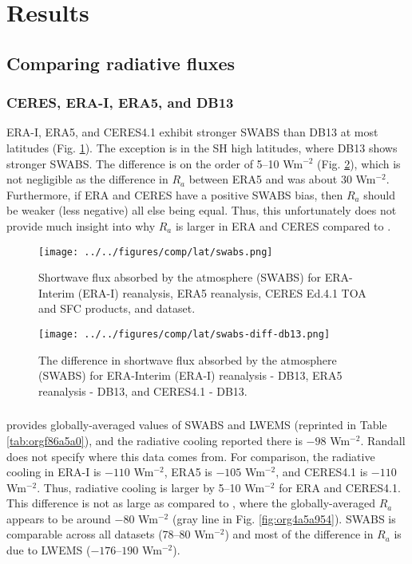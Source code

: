 \documentclass[11pt]{article}
\begin{document}
\section{Results}
\label{sec:orgb57f76e}
\subsection{Comparing radiative fluxes}
\label{sec:orgdd37950}
\subsubsection{CERES, ERA-I, ERA5, and DB13}
\label{sec:orga0d8db3}
ERA-I, ERA5, and CERES4.1 exhibit stronger SWABS than DB13 at most latitudes (Fig. \ref{fig:orgc1199f7}). The exception is in the SH high latitudes, where DB13 shows stronger SWABS. The difference is on the order of 5--10 Wm\(^{-2}\) (Fig. \ref{fig:org30a1620}), which is not negligible as the difference in \(R_a\) between ERA5 and \cite{hartmann_global_2016} was about 30 Wm\(^{-2}\). Furthermore, if ERA and CERES have a positive SWABS bias, then \(R_a\) should be weaker (less negative) all else being equal. Thus, this unfortunately does not provide much insight into why \(R_a\) is larger in ERA and CERES compared to \cite{hartmann_global_2016}.

\begin{figure}[htbp]
\centering
\texttt{[image: ../../figures/comp/lat/swabs.png]}
\caption{\label{fig:orgc1199f7}Shortwave flux absorbed by the atmosphere (SWABS) for ERA-Interim (ERA-I) reanalysis, ERA5 reanalysis, CERES Ed.4.1 TOA and SFC products, and \cite{donohoe_seasonal_2013} dataset.}
\end{figure}

\begin{figure}[htbp]
\centering
\texttt{[image: ../../figures/comp/lat/swabs-diff-db13.png]}
\caption{\label{fig:org30a1620}The difference in shortwave flux absorbed by the atmosphere (SWABS) for ERA-Interim (ERA-I) reanalysis - DB13, ERA5 reanalysis - DB13, and CERES4.1 - DB13.}
\end{figure}

\subsubsection{\cite{randall_atmosphere_2012}}
\label{sec:org819881b}
\cite{randall_atmosphere_2012} provides globally-averaged values of SWABS and LWEMS (reprinted in Table \ref{tab:orgf86a5a0}), and the radiative cooling reported there is \(-98\) Wm\(^{-2}\). Randall does not specify where this data comes from. For comparison, the radiative cooling in ERA-I is \(-110\) Wm\(^{-2}\), ERA5 is \(-105\) Wm\(^{-2}\), and CERES4.1 is \(-110\) Wm\(^{-2}\). Thus, radiative cooling is larger by 5--10 Wm\(^{-2}\) for ERA and CERES4.1. This difference is not as large as compared to \cite{hartmann_global_2016}, where the globally-averaged \(R_a\) appears to be around \(-80\) Wm\(^{-2}\) (gray line in Fig. \ref{fig:org4a5a954}). SWABS is comparable across all datasets (78--80 Wm\(^{-2}\)) and most of the difference in \(R_a\) is due to LWEMS (\(-176\text{--}190\) Wm\(^{-2}\)).
\end{document}
